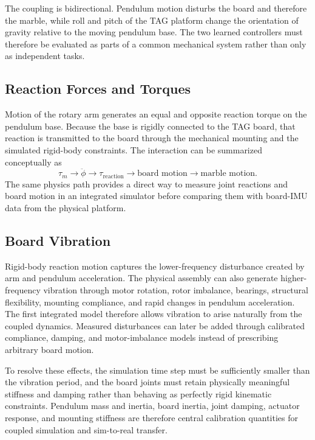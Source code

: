 \documentclass[9pt]{extarticle}
\begin{document}
The coupling is bidirectional. Pendulum motion disturbs the board and therefore the marble, while roll and pitch of the TAG platform change the orientation of gravity relative to the moving pendulum base. The two learned controllers must therefore be evaluated as parts of a common mechanical system rather than only as independent tasks.

\subsection{Reaction Forces and Torques}
Motion of the rotary arm generates an equal and opposite reaction torque on the pendulum base. Because the base is rigidly connected to the TAG board, that reaction is transmitted to the board through the mechanical mounting and the simulated rigid-body constraints. The interaction can be summarized conceptually as
\begin{equation}
\tau_m
\rightarrow
\ddot{\phi}
\rightarrow
\tau_{\mathrm{reaction}}
\rightarrow
\text{board motion}
\rightarrow
\text{marble motion}.
\end{equation}
The same physics path provides a direct way to measure joint reactions and board motion in an integrated simulator before comparing them with board-IMU data from the physical platform.

\subsection{Board Vibration}
Rigid-body reaction motion captures the lower-frequency disturbance created by arm and pendulum acceleration. The physical assembly can also generate higher-frequency vibration through motor rotation, rotor imbalance, bearings, structural flexibility, mounting compliance, and rapid changes in pendulum acceleration. The first integrated model therefore allows vibration to arise naturally from the coupled dynamics. Measured disturbances can later be added through calibrated compliance, damping, and motor-imbalance models instead of prescribing arbitrary board motion.

To resolve these effects, the simulation time step must be sufficiently smaller than the vibration period, and the board joints must retain physically meaningful stiffness and damping rather than behaving as perfectly rigid kinematic constraints. Pendulum mass and inertia, board inertia, joint damping, actuator response, and mounting stiffness are therefore central calibration quantities for coupled simulation and sim-to-real transfer.
\end{document}

